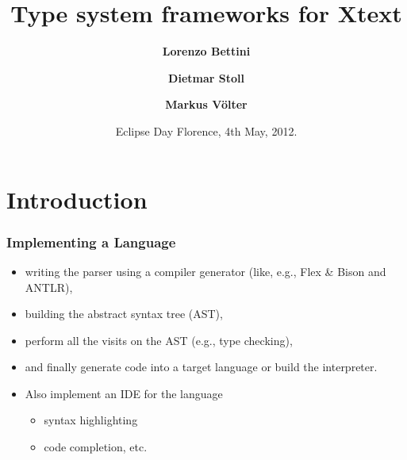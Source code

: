 \title{Type system frameworks for Xtext}
\author{\textbf{Lorenzo Bettini} \and \textbf{Dietmar Stoll} \and \textbf{Markus
V\"olter}}
\date{Eclipse Day Florence, 4th May, 2012.}


\maketitle


\section{Introduction}

\begin{frame}
  \frametitle{Implementing a Language}

  \begin{itemize}
  \item writing the parser using a compiler generator (like, e.g.,
    Flex \& Bison and ANTLR),
  \item building the abstract syntax tree (AST), 
  \item perform all the visits on the AST (e.g., type checking),
  \item and finally generate code into a target language or build the
    interpreter.
  \end{itemize}


\begin{itemize}
\item Also implement an IDE for the language
  \begin{itemize}
  \item syntax highlighting
  \item code completion, etc.
  \end{itemize}

\end{itemize}
\end{frame}






